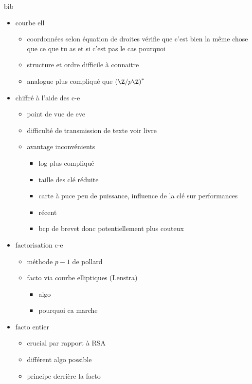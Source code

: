 bib
\begin{itemize}
    \item courbe ell
        \begin{itemize}
            \item coordonnées selon équation de droites vérifie que c'est bien la même chose que ce
        que tu as et si c'est pas le cas pourquoi
            \item structure et ordre difficile à connaitre
            \item analogue plus compliqué que $\left( \Z / p\Z \right)^*$
        \end{itemize}
    \item chiffré à l'aide des c-e
        \begin{itemize}
            \item point de vue de eve
            \item difficulté de transmission de texte voir livre
            \item avantage inconvénients
                \begin{itemize}
                    \item log plus compliqué
                    \item taille des clé réduite
                    \item carte à puce peu de puissance, influence de la clé sur
                        performances
                    \item récent 
                    \item bcp de brevet donc potentiellement plus couteux
                \end{itemize}
        \end{itemize}
    \item factorisation c-e
        \begin{itemize}
            \item méthode $p-1$ de pollard
            \item facto via courbe elliptiques (Lenstra)
                \begin{itemize}
                    \item algo
                    \item pourquoi ca marche
                \end{itemize}
        \end{itemize}
    \item facto entier
        \begin{itemize}
            \item crucial par rapport à RSA
            \item différent algo possible
            \item principe derrière la facto
        \end{itemize}
\end{itemize}

